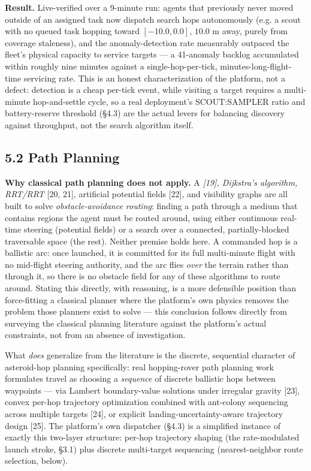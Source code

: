 \documentclass[conference]{IEEEtran}
\begin{document}
\textbf{Result.} Live-verified over a 9-minute run: agents that previously never moved outside of an assigned task now dispatch search hops autonomously (e.g. a scout with no queued task hopping toward $[-10.0, 0.0]$, $10.0$ m away, purely from coverage staleness), and the anomaly-detection rate measurably outpaced the fleet's physical capacity to service targets --- a 41-anomaly backlog accumulated within roughly nine minutes against a single-hop-per-tick, minutes-long-flight-time servicing rate. This is an honest characterization of the platform, not a defect: detection is a cheap per-tick event, while visiting a target requires a multi-minute hop-and-settle cycle, so a real deployment's SCOUT:SAMPLER ratio and battery-reserve threshold (\S4.3) are the actual levers for balancing discovery against throughput, not the search algorithm itself.

\subsection*{5.2 Path Planning}

\textbf{Why classical path planning does not apply.} A\emph{ [19], Dijkstra's algorithm, RRT/RRT} [20, 21], artificial potential fields [22], and visibility graphs are all built to solve \emph{obstacle-avoidance routing}: finding a path through a medium that contains regions the agent must be routed around, using either continuous real-time steering (potential fields) or a search over a connected, partially-blocked traversable space (the rest). Neither premise holds here. A commanded hop is a ballistic arc: once launched, it is committed for its full multi-minute flight with no mid-flight steering authority, and the arc flies \emph{over} the terrain rather than through it, so there is no obstacle field for any of these algorithms to route around. Stating this directly, with reasoning, is a more defensible position than force-fitting a classical planner where the platform's own physics removes the problem those planners exist to solve --- this conclusion follows directly from surveying the classical planning literature against the platform's actual constraints, not from an absence of investigation.

What \emph{does} generalize from the literature is the discrete, sequential character of asteroid-hop planning specifically: real hopping-rover path planning work formulates travel as choosing a \emph{sequence} of discrete ballistic hops between waypoints --- via Lambert boundary-value solutions under irregular gravity [23], convex per-hop trajectory optimization combined with ant-colony sequencing across multiple targets [24], or explicit landing-uncertainty-aware trajectory design [25]. The platform's own dispatcher (\S4.3) is a simplified instance of exactly this two-layer structure: per-hop trajectory shaping (the rate-modulated launch stroke, \S3.1) plus discrete multi-target sequencing (nearest-neighbor route selection, below).
\end{document}
